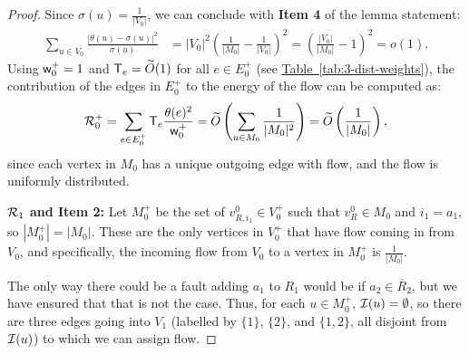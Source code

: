 \documentclass{theoretics}
\newcommand{\tabl}[1]{\hyperref[tab:#1]{Table~\ref*{tab:#1}}}
\renewcommand{\>}{\rangle}
\newcommand{\<}{\langle}
\renewcommand{\(}{\left(}
\renewcommand{\)}{\right)}
\def\w{{\sf w}}
\begin{document}
\begin{proof}
Since $\sigma(u)=\frac{1}{|V_0|}$, we can conclude with \textbf{Item 4} of the lemma statement:
\begin{equation*}
\begin{split}
\sum_{u\in V_0}\frac{|\theta(u)-\sigma(u)|^2}{\sigma(u)} 
&= |V_0|^2\left(\frac{1}{|M_0|}-\frac{1}{|V_0|}\right)^2
= \left(\frac{|V_0|}{|M_0|}-1\right)^2=o(1).
\end{split}\label{eq:delta-bound}
\end{equation*}
Using $\w_0^+=1$ and ${\sf T}_e=\widetilde{O}(1)$ for all $e\in E_0^+$ (see \tabl{3-dist-weights}), the contribution of the edges in $E_0^+$ to the energy of the flow can be computed as:
\begin{equation}
{\cal R}_0^+ = \sum_{e\in E_0^+}{\sf T}_e\frac{\theta(e)^2}{\w_0^+} = \widetilde{O}\left(\sum_{u\in M_0}\frac{1}{|M_0|^2}\right)=\widetilde{O}\left(\frac{1}{|M_0|}\right),\label{eq:R1}
\end{equation}
since each vertex in $M_0$ has a unique outgoing edge with flow, and the flow is uniformly distributed.

\vskip7pt
\noindent\textbf{${\cal R}_1$ and Item 2:} Let $M_0^+$ be the set of $v^0_{R,i_1}\in V_0^+$ such that $v^0_{R}\in M_0$ and $i_1=a_1$, so $|M_0^+|=|M_0|$. These are the only vertices in $V_0^+$ that have flow coming in from $V_0$, and specifically, the incoming flow from $V_0$ to a vertex in $M_0^+$ is $\frac{1}{|M_0|}$. 


The only way there could be a fault adding $a_1$ to $R_1$ would be if $a_2\in \overline{R}_2$, but we have ensured that that is not the case. Thus, for each $u\in M_0^+$, ${\cal I}(u)=\emptyset$, so there are three edges going into $V_1$ (labelled by $\{1\}$, $\{2\}$, and $\{1,2\}$, all disjoint from ${\cal I}(u)$) to which we can assign flow. 


\end{proof}
\end{document}
